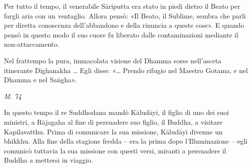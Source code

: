 Per tutto il tempo, il venerabile Sāriputta era stato in piedi dietro il
Beato per fargli aria con un ventaglio. Allora pensò: «Il Beato, il
Sublime, sembra che parli per diretta conoscenza dell’abbandono e della
rinuncia a queste cose». E quando pensò in questo modo il suo cuore fu
liberato dalle contaminazioni mediante il non-attaccamento.


Nel frattempo la pura, immacolata visione del Dhamma sorse nell’asceta
itinerante Dīghanakha …​ Egli disse: «…​ Prendo rifugio nel Maestro
Gotama, e nel Dhamma e nel Saṅgha».


\emph{M. 74}


 In questo tempo il re Suddhodana mandò Kāludāyī, il
figlio di uno dei suoi ministri, a Rājagaha al fine di persuadere suo
figlio, il Buddha, a visitare Kapilavatthu. Prima di comunicare la sua
missione, Kāludāyī divenne un bhikkhu. Alla fine della stagione fredda –
era la prima dopo l’Illuminazione – egli comunicò tuttavia la sua
missione con questi versi, miranti a persuadere il Buddha a mettersi in
viaggio.


